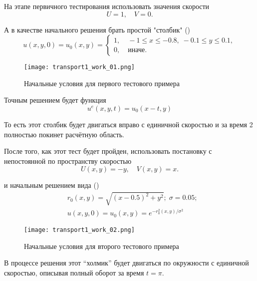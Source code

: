 На этапе первичного тестирования использовать
значения скорости
\begin{equation*}
    U = 1, \quad V = 0.
\end{equation*}

А в качестве начального решения брать простой "столбик" ()
\begin{equation*}
    u(x,y,0) = u_0(x, y) = \begin{cases}
        1, & \; -1\leq x \leq -0.8, \; -0.1 \leq y \leq 0.1, \\
        0, & \; \text{иначе}.
    \end{cases}
\end{equation*}

\begin{figure}[h]
\centering
\texttt{[image: transport1\_work\_01.png]}
\caption{Начальные условия для первого тестового примера}
\label{fig:transport1_work_01}
\end{figure}

Точным решением будет функция
\begin{equation*}
    u^e(x, y, t) = u_0(x-t, y)
\end{equation*}

То есть этот столбик будет двигаться вправо с единичной
скоростью и за время 2 полностью покинет расчётную область.

\label{sec:circle_transport}

После того, как этот тест будет пройден,
использовать постановку с непостоянной по пространству скоростью
\begin{equation*}
    U(x, y) = -y, \quad V(x, y) = x.
\end{equation*}

и начальным решением вида ()
\begin{align*}
    &r_0(x, y) = \sqrt{(x - 0.5)^2 + y^2}; \; \sigma = 0.05;\\
    &u(x, y, 0) = u_0(x, y) = e^{-r_0^2(x, y)/\sigma^2}
\end{align*}

\begin{figure}[h]
\centering
\texttt{[image: transport1\_work\_02.png]}
\caption{Начальные условия для второго тестового примера}
\label{fig:transport1_work_02}
\end{figure}

В процессе решения этот ``холмик'' будет
двигаться по окружности с единичной скоростью, описывая полный оборот за время $t=\pi$.

